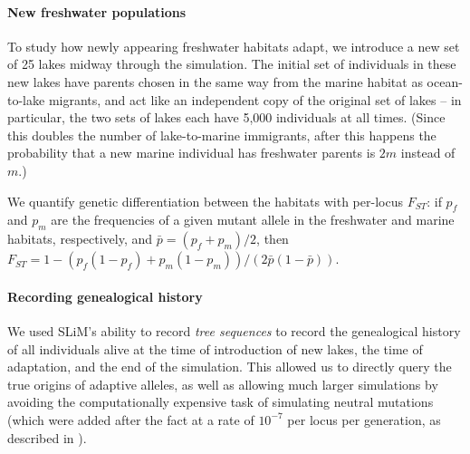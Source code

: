 \documentclass{article}
\begin{document}
\paragraph{New freshwater populations} 
To study how newly appearing freshwater habitats adapt, we introduce a new set of 25 lakes midway through the simulation.
The initial set of individuals in these new lakes have parents chosen in the same way from the marine habitat as ocean-to-lake migrants,
and act like an independent copy of the original set of lakes -- in particular, 
the two sets of lakes each have 5,000 individuals at all times. 
(Since this doubles the number of lake-to-marine immigrants, 
after this happens the probability that a new marine individual has freshwater parents is $2m$ instead of $m$.)

We quantify genetic differentiation between the habitats with per-locus $F_{ST}$:
if $p_f$ and $p_m$ are the frequencies of a given mutant allele in the freshwater and marine habitats,
respectively,
and $\bar p = (p_f + p_m)/2$,
then $F_{ST} = 1 - (p_f (1-p_f) + p_m (1-p_m))/ (2 \bar p (1-\bar p))$.


\paragraph{Recording genealogical history}
We used SLiM's ability to record \emph{tree sequences} \citep{haller2018treesequence}
to record the genealogical history of all individuals alive 
at the time of introduction of new lakes, the time of adaptation, and the end of the simulation.
This allowed us to directly query the true origins of adaptive alleles,
as well as allowing much larger simulations
by avoiding the computationally expensive task of simulating neutral mutations
(which were added after the fact at a rate of $10^{-7}$ per locus per generation, 
as described in \citet{kelleher2018efficient}).
\end{document}
